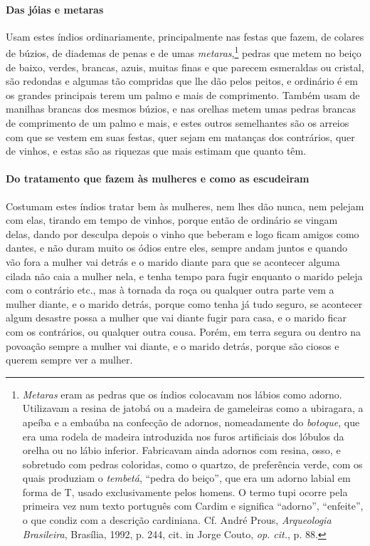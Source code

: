 \paragraph{Das jóias e metaras}

Usam estes índios ordinariamente, principalmente nas festas
que fazem, de colares de búzios, de diademas de penas e de umas
\textit{metaras},\footnote{ \textit{Metaras} eram as pedras que os
índios colocavam nos lábios como adorno. Utilizavam a resina de
jatobá ou a madeira de gameleiras como a ubiragara, a apeíba e a
embaúba na confecção de adornos, nomeadamente do \textit{botoque}, que
era uma rodela de madeira introduzida nos furos artificiais dos lóbulos
da orelha ou no lábio inferior. Fabricavam ainda adornos com resina,
osso, e sobretudo com pedras coloridas, como o quartzo, de preferência
verde, com os quais produziam o \textit{tembetá}, ``pedra do beiço'', que
era um adorno labial em forma de T, usado exclusivamente pelos
homens. O termo tupi ocorre pela primeira vez num texto
português com Cardim e significa ``adorno'', ``enfeite'', o que condiz com
a descrição cardiniana. Cf. André Prous, \textit{Arqueologia
Brasileira}, Brasília, 1992, p. 244, cit. in Jorge Couto, \textit{op. cit.}, 
p. 88.} pedras que metem no beiço de baixo, verdes, brancas,
azuis, muitas finas e que parecem esmeraldas ou cristal, são redondas e
algumas tão compridas que lhe dão pelos peitos, e ordinário é em os
grandes principais terem um palmo e mais de comprimento. Também usam de
manilhas brancas dos mesmos búzios, e nas orelhas metem umas pedras
brancas de comprimento de um palmo e mais, e estes outros semelhantes
são os arreios com que se vestem em suas festas, quer sejam em matanças
dos contrários, quer de vinhos, e estas são as riquezas que mais
estimam que quanto têm.

\paragraph{Do tratamento que fazem às mulheres e como as \mbox{escudeiram}}

Costumam estes índios tratar bem às mulheres, nem lhes dão
nunca, nem pelejam com elas, tirando em tempo de vinhos, porque então
de ordinário se vingam delas, dando por desculpa depois o vinho que
beberam e logo ficam amigos como dantes, e não duram muito os ódios
entre eles, sempre andam juntos e quando vão fora a mulher vai detrás
e o marido diante para que se acontecer alguma cilada não caia a mulher
nela, e tenha tempo para fugir enquanto o marido peleja com o
contrário etc., mas à tornada da roça ou qualquer outra parte vem a
mulher diante, e o marido detrás, porque como tenha já tudo seguro, se
acontecer algum desastre possa a mulher que vai diante fugir para casa,
e o marido ficar com os contrários, ou qualquer outra cousa. Porém, em
terra segura ou dentro na povoação sempre a mulher vai diante, e o
marido detrás, porque são ciosos e querem sempre ver a mulher.


